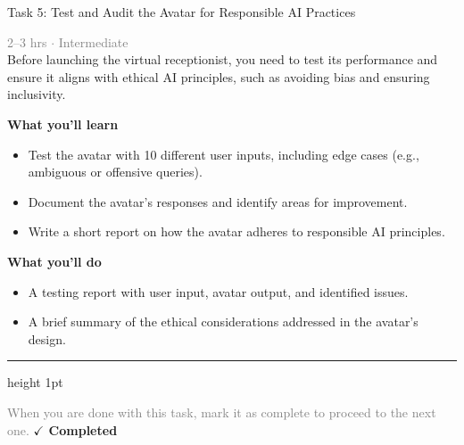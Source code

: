\documentclass[10pt,a4paper]{article}
\begin{document}
\begin{taskbox}{Task 5: Test and Audit the Avatar for Responsible AI Practices}

    {\small \textcolor{gray}{2--3 hrs $\cdot$ Intermediate}}\\[12pt]

      
Before launching the virtual receptionist, you need to test its performance and ensure it aligns with ethical AI principles, such as avoiding bias and ensuring inclusivity.


\vspace{8pt}
{\large \textbf{\textcolor{brandLight}{What you'll learn}}}\\[4pt]  
\begin{itemize}
    \item Test the avatar with 10 different user inputs, including edge cases (e.g., ambiguous or offensive queries).  
    \item Document the avatar’s responses and identify areas for improvement.  
    \item Write a short report on how the avatar adheres to responsible AI principles.
\end{itemize}

\vspace{8pt}
{\large \textbf{\textcolor{brandLight}{What you'll do}}}\\[4pt]  
\begin{itemize}
    \item A testing report with user input, avatar output, and identified issues.  
    \item A brief summary of the ethical considerations addressed in the avatar’s design.\par
\end{itemize}

    \vspace{16pt}

    \textcolor{cardBorder}{\hrule height 1pt}\vspace{8pt}

    \small \textcolor{gray}{When you are done with this task, mark it as complete to proceed to the next one.} \hfill \textbf{\textcolor{brandDark}{$\checkmark$ Completed}}

\end{taskbox}
\end{document}
